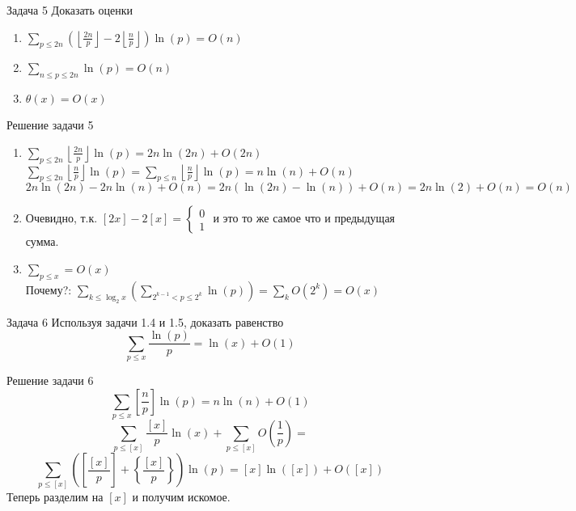 \documentclass[a4paper,12pt]{article}
\newcommand{\TE}{\theta}
\newcommand{\SL}{\sum\limits}
\newcommand{\os}{\left(}
\newcommand{\cs}{\right)}
\begin{document}
\begin{mybox}{}

\begin{task}{Задача 5}
Доказать оценки
\begin{enumerate}
\item $\SL_{p\le 2n}\os \left\lfloor\frac{2n}{p}\right\rfloor  - 2\left\lfloor\frac{n}{p}\right\rfloor\cs \ln(p) = O(n)$
\item $\SL_{n\le p\le 2n}\ln(p) = O(n)$
\item $\TE(x) = O(x)$
\end{enumerate}
\end{task}


\begin{sol}{Решение задачи 5}
\begin{enumerate}
\item $\SL_{p\le 2n} \left\lfloor\frac{2n}{p}\right\rfloor \ln(p) = 2n\ln(2n) + O(2n)$\\
$\SL_{p\le 2n} \left\lfloor\frac{n}{p}\right\rfloor \ln(p) = \SL_{p\le n} \left\lfloor\frac{n}{p}\right\rfloor \ln(p) = n\ln(n) + O(n)$\\
$2n\ln(2n) - 2n\ln(n) + O(n) = 2n(\ln(2n) - \ln(n))+O(n) = 2n\ln(2) + O(n) = O(n)$
\item Очевидно, т.к. $[2x]-2[x] = \begin{cases}0\\1\end{cases}$ и это то же самое что и предыдущая сумма.
\item $\SL_{p\le x} = O(x)$\\
Почему?: $\SL_{k\le \log_2x}\os  \SL_{2^{k-1}<p\le 2^k}\ln(p)  \cs = \SL_k O(2^k) = O(x)$
\end{enumerate}
\end{sol}


\begin{task}{Задача 6}
Используя задачи 1.4 и 1.5, доказать равенство \[\SL_{p\le x}\frac{\ln(p)}{p} = \ln(x) + O(1)\]
\end{task}
\begin{sol}{Решение задачи 6}
\[\SL_{p\le x}\left[\frac{n}{p}\right]\ln(p) = n\ln(n) + O(1)\]
\[\SL_{p\le [x]}\frac{[x]}{p}\ln(x) + \SL_{p\le [x]} O\os\frac{1}{p}\cs = \]
\[\SL_{p\le [x]}\os \left[\frac{[x]}{p}\right] + \left\{\frac{[x]}{p}\right\}  \cs\ln(p) = [x]\ln([x]) + O([x])\]
Теперь разделим на $[x]$ и получим искомое.
\end{sol}
\end{mybox}
\newpage
\end{document}
